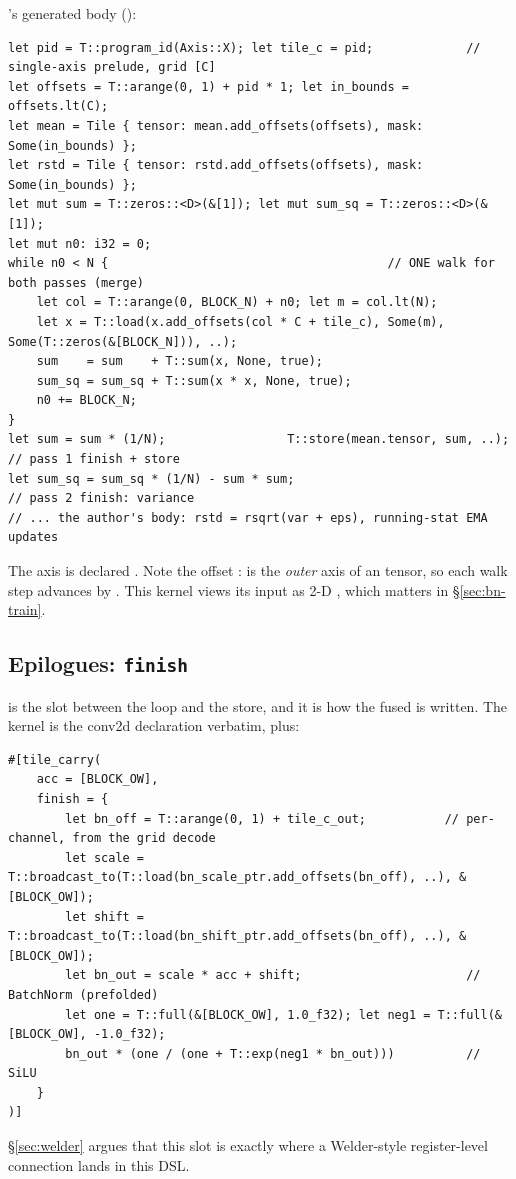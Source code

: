 's generated body
():

\begin{lstlisting}
let pid = T::program_id(Axis::X); let tile_c = pid;             // single-axis prelude, grid [C]
let offsets = T::arange(0, 1) + pid * 1; let in_bounds = offsets.lt(C);
let mean = Tile { tensor: mean.add_offsets(offsets), mask: Some(in_bounds) };
let rstd = Tile { tensor: rstd.add_offsets(offsets), mask: Some(in_bounds) };
let mut sum = T::zeros::<D>(&[1]); let mut sum_sq = T::zeros::<D>(&[1]);
let mut n0: i32 = 0;
while n0 < N {                                       // ONE walk for both passes (merge)
    let col = T::arange(0, BLOCK_N) + n0; let m = col.lt(N);
    let x = T::load(x.add_offsets(col * C + tile_c), Some(m), Some(T::zeros(&[BLOCK_N])), ..);
    sum    = sum    + T::sum(x, None, true);
    sum_sq = sum_sq + T::sum(x * x, None, true);
    n0 += BLOCK_N;
}
let sum = sum * (1/N);                 T::store(mean.tensor, sum, ..);   // pass 1 finish + store
let sum_sq = sum_sq * (1/N) - sum * sum;                                 // pass 2 finish: variance
// ... the author's body: rstd = rsqrt(var + eps), running-stat EMA updates
\end{lstlisting}

The  axis  is declared . Note the offset
:  is the \emph{outer} axis of an \code{[N, C]} tensor,
so each walk step advances by . This kernel views its input as 2-D
\code{[N, C]}, which matters in \S\ref{sec:bn-train}.

\subsection{Epilogues: \texttt{finish}}

 is the slot between the loop and the store, and it is how the fused
 is written. The kernel is the conv2d declaration
verbatim, plus:

\begin{lstlisting}
#[tile_carry(
    acc = [BLOCK_OW],
    finish = {
        let bn_off = T::arange(0, 1) + tile_c_out;           // per-channel, from the grid decode
        let scale = T::broadcast_to(T::load(bn_scale_ptr.add_offsets(bn_off), ..), &[BLOCK_OW]);
        let shift = T::broadcast_to(T::load(bn_shift_ptr.add_offsets(bn_off), ..), &[BLOCK_OW]);
        let bn_out = scale * acc + shift;                       // BatchNorm (prefolded)
        let one = T::full(&[BLOCK_OW], 1.0_f32); let neg1 = T::full(&[BLOCK_OW], -1.0_f32);
        bn_out * (one / (one + T::exp(neg1 * bn_out)))          // SiLU
    }
)]
\end{lstlisting}

\S\ref{sec:welder} argues that this  slot is exactly where a Welder-style
register-level connection lands in this DSL.
